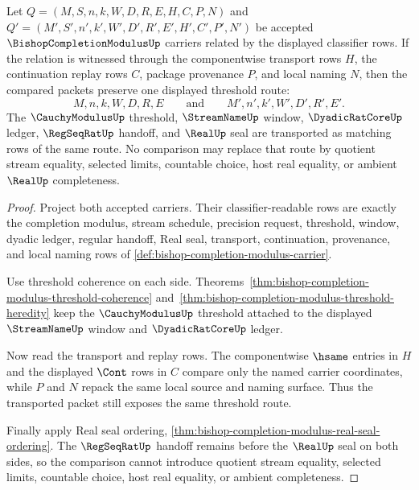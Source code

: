 \begin{theorem}
\label{thm:bishop-completion-modulus-same-threshold-transport}
Let $Q=(M,S,n,k,W,D,R,E,H,C,P,N)$ and $Q'=(M',S',n',k',W',D',R',E',H',C',P',N')$ be accepted $\BishopCompletionModulusUp$ carriers related by the displayed classifier rows. If the relation is witnessed through the componentwise transport rows $H$, the continuation replay rows $C$, package provenance $P$, and local naming $N$, then the compared packets preserve one displayed threshold route:
$$
M,n,k,W,D,R,E
\qquad\text{and}\qquad
M',n',k',W',D',R',E' .
$$
The $\CauchyModulusUp$ threshold, $\StreamNameUp$ window, $\DyadicRatCoreUp$ ledger, $\RegSeqRatUp$ handoff, and $\RealUp$ seal are transported as matching rows of the same route. No comparison may replace that route by quotient stream equality, selected limits, countable choice, host real equality, or ambient $\RealUp$ completeness.
\end{theorem}
\begin{proof}
Project both accepted carriers. Their classifier-readable rows are exactly the completion modulus, stream schedule, precision request, threshold, window, dyadic ledger, regular handoff, Real seal, transport, continuation, provenance, and local naming rows of \autoref{def:bishop-completion-modulus-carrier}.

Use threshold coherence on each side. Theorems~\ref{thm:bishop-completion-modulus-threshold-coherence} and~\ref{thm:bishop-completion-modulus-threshold-heredity} keep the $\CauchyModulusUp$ threshold attached to the displayed $\StreamNameUp$ window and $\DyadicRatCoreUp$ ledger.

Now read the transport and replay rows. The componentwise $\hsame$ entries in $H$ and the displayed $\Cont$ rows in $C$ compare only the named carrier coordinates, while $P$ and $N$ repack the same local source and naming surface. Thus the transported packet still exposes the same threshold route.

Finally apply Real seal ordering, \autoref{thm:bishop-completion-modulus-real-seal-ordering}. The $\RegSeqRatUp$ handoff remains before the $\RealUp$ seal on both sides, so the comparison cannot introduce quotient stream equality, selected limits, countable choice, host real equality, or ambient completeness.
\end{proof}

